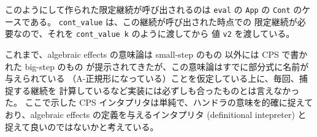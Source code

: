 このようにして作られた限定継続が呼び出されるのは \texttt{eval} の
\texttt{App} の \texttt{Cont} のケースである。
\texttt{cont\_value} は、この継続が呼び出された時点での
限定継続が必要なので、それを \texttt{cont\_value k} のように渡してから
値 \texttt{v2} を渡している。

これまで、algebraic effects の意味論は small-step のもの
\cite{10.1145/2500365.2500590, PRETNAR201519}
以外には
CPS で書かれた big-step のもの
\cite{e6cb0c3222794e48bf38cf44e46fe4aa}
が提示されてきたが、この意味論はすでに部分式に名前が与えられている
（A-正規形になっている）ことを仮定している上に、毎回、捕捉する継続を
計算しているなど実装には必ずしも合ったものとは言えなかった。
ここで示した CPS インタプリタは単純で、ハンドラの意味を的確に捉えて
おり、algebraic effects の定義を与えるインタプリタ (definitional
intepreter) と捉えて良いのではないかと考えている。

